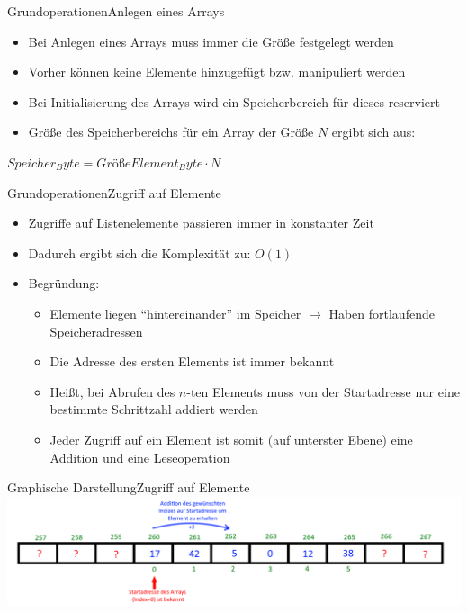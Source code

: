 \begin{frame}{Grundoperationen}{Anlegen eines Arrays}
	\begin{itemize}
		\item Bei Anlegen eines Arrays muss immer die Größe festgelegt werden
		\item Vorher können keine Elemente hinzugefügt bzw. manipuliert werden
		\item Bei Initialisierung des Arrays wird ein Speicherbereich für dieses reserviert
		\item Größe des Speicherbereichs für ein Array der Größe $N$ ergibt sich aus:
	\end{itemize}
	$Speicher_Byte=GrößeElement_Byte\cdot N$
\end{frame}

\begin{frame}{Grundoperationen}{Zugriff auf Elemente}
	\begin{itemize}
		\item Zugriffe auf Listenelemente passieren immer in konstanter Zeit
		\item Dadurch ergibt sich die Komplexität zu: $O(1)$
		\item Begründung:
		\begin{itemize}
			\item Elemente liegen "`hintereinander"' im Speicher $\rightarrow$ Haben fortlaufende Speicheradressen
			\item Die Adresse des ersten Elements ist immer bekannt
			\item Heißt, bei Abrufen des $n$-ten Elements muss von der Startadresse nur eine bestimmte Schrittzahl addiert werden
			\item Jeder Zugriff auf ein Element ist somit (auf unterster Ebene) eine Addition und eine Leseoperation
		\end{itemize}
	\end{itemize}
\end{frame}


\begin{frame}{Graphische Darstellung}{Zugriff auf Elemente}
\includegraphics[width=\textwidth]{graph/array_access}
\end{frame}

